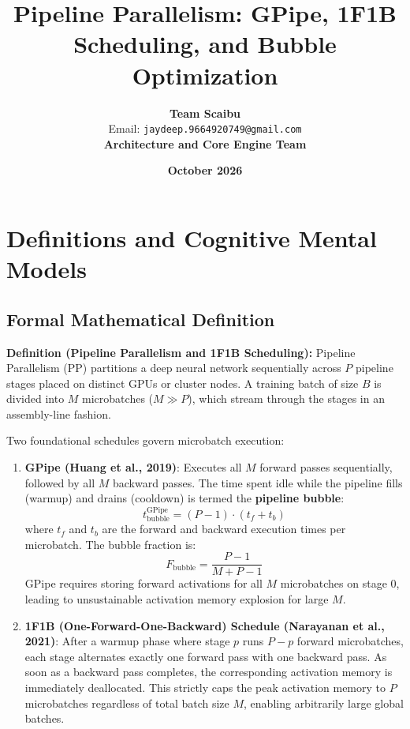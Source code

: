 \documentclass[11pt,a4paper]{article}
\title{\textbf{Pipeline Parallelism: GPipe, 1F1B Scheduling, and Bubble Optimization}}
\author{\textbf{Team Scaibu} \\ \small Email: \texttt{jaydeep.9664920749@gmail.com} \\ \small \textbf{Architecture and Core Engine Team}}
\date{\textbf{October 2026}}
\theoremstyle{definition}
\begin{document}
\maketitle

\section{Definitions and Cognitive Mental Models}

\subsection{Formal Mathematical Definition}
\textbf{Definition (Pipeline Parallelism and 1F1B Scheduling):}
Pipeline Parallelism (PP) partitions a deep neural network sequentially across $P$ pipeline stages placed on distinct GPUs or cluster nodes. A training batch of size $B$ is divided into $M$ microbatches ($M \gg P$), which stream through the stages in an assembly-line fashion.

Two foundational schedules govern microbatch execution:
\begin{enumerate}
    \item \textbf{GPipe (Huang et al., 2019)}:
    Executes all $M$ forward passes sequentially, followed by all $M$ backward passes. The time spent idle while the pipeline fills (warmup) and drains (cooldown) is termed the \textbf{pipeline bubble}:
    {\boldmath
    \begin{equation}
    t_{\text{bubble}}^{\text{GPipe}} = (P - 1) \cdot (t_f + t_b)
    \end{equation}
    }
    where $t_f$ and $t_b$ are the forward and backward execution times per microbatch. The bubble fraction is:
    {\boldmath
    \begin{equation}
    F_{\text{bubble}} = \frac{P - 1}{M + P - 1}
    \end{equation}
    }
    GPipe requires storing forward activations for all $M$ microbatches on stage 0, leading to unsustainable activation memory explosion for large $M$.
    \item \textbf{1F1B (One-Forward-One-Backward) Schedule (Narayanan et al., 2021)}:
    After a warmup phase where stage $p$ runs $P - p$ forward microbatches, each stage alternates exactly one forward pass with one backward pass. As soon as a backward pass completes, the corresponding activation memory is immediately deallocated. This strictly caps the peak activation memory to $P$ microbatches regardless of total batch size $M$, enabling arbitrarily large global batches.
\end{enumerate}
\end{document}
